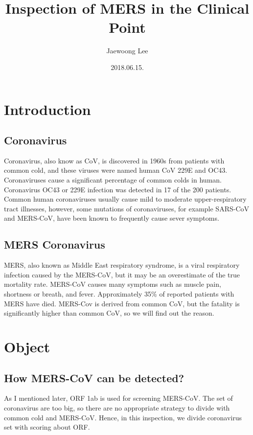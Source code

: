 \documentclass[aps,10pt,a4paper]{article}
\title{Inspection of MERS in the Clinical Point}
\author{Jaewoong Lee}
\date{2018.06.15.}
\begin{document}
	\maketitle
	\newpage
	
	\tableofcontents
	\listoftables
	\listoffigures
	\newpage
	
	\section{Introduction}
		\subsection{Coronavirus}
			Coronavirus, also know as CoV, is discovered in 1960s from patients with common cold, and these viruses were named human CoV 229E and OC43.\cite{ref:cold} Coronaviruses cause a significant percentage of common colds in human. Coronavirus OC43 or 229E infection was detected in 17 of the 200 patients.\cite{ref:rateCold} Common human coronaviruses usually cause mild to moderate upper-respiratory tract illnesses, however, some mutations of coronaviruses, for example SARS-CoV and MERS-CoV, have been known to frequently cause sever symptoms.\cite{ref:CoVCDC}
		
		\subsection{MERS Coronavirus}
			MERS, also known as Middle East respiratory syndrome, is a viral respiratory infection caused by the MERS-CoV, but it may be an overestimate of the true mortality rate.\cite{ref:MersWho} MERS-CoV causes many symptoms such as muscle pain, shortness or breath, and fever. Approximately 35\% of reported patients with MERS have died.\cite{ref:MersWho} MERS-Cov is derived from common CoV, but the fatality is significantly higher than common CoV, so we will find out the reason.
	
	\section{Object}
		\subsection{How MERS-CoV can be detected?}
			As I mentioned later, ORF 1ab is used for screening MERS-CoV. The set of coronavirus are too big, so there are no appropriate strategy to divide with common cold and MERS-CoV. Hence, in this inspection, we divide coronavirus set with scoring about ORF. 
	
\end{document}
